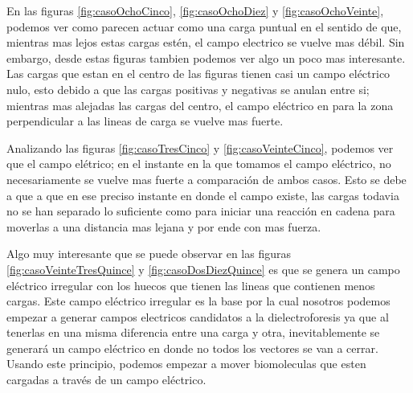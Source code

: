 
\tab En las figuras \ref{fig:casoOchoCinco}, \ref{fig:casoOchoDiez} y \ref{fig:casoOchoVeinte}, podemos ver como parecen actuar como una carga puntual en el sentido de que, mientras mas lejos estas cargas estén, el campo electrico se vuelve mas débil. Sin embargo, desde estas figuras tambien podemos ver algo un poco mas interesante. Las cargas que estan en el centro de las figuras tienen casi un campo eléctrico nulo, esto debido a que las cargas positivas y negativas se anulan entre si; mientras mas alejadas las cargas del centro, el campo eléctrico en para la zona perpendicular a las lineas de carga se vuelve mas fuerte. 

\tab Analizando las figuras \ref{fig:casoTresCinco} y \ref{fig:casoVeinteCinco}, podemos ver que el campo elétrico; en el instante en la que tomamos el campo eléctrico, no necesariamente se vuelve mas fuerte a comparación de ambos casos. Esto se debe a que a que en ese preciso instante en donde el campo existe, las cargas todavia no se han separado lo suficiente como para iniciar una reacción en cadena para moverlas a una distancia mas lejana y por ende con mas fuerza.

\tab Algo muy interesante que se puede observar en las figuras \ref{fig:casoVeinteTresQuince} y \ref{fig:casoDosDiezQuince} es que se genera un campo eléctrico irregular con los huecos que tienen las lineas que contienen menos cargas. Este campo eléctrico irregular es la base por la cual nosotros podemos empezar a generar campos electricos candidatos a la dielectroforesis ya que al tenerlas en una misma diferencia entre una carga y otra, inevitablemente se generará un campo eléctrico en donde no todos los vectores se van a cerrar. Usando este principio, podemos empezar a mover biomoleculas que esten cargadas a través de un campo eléctrico.